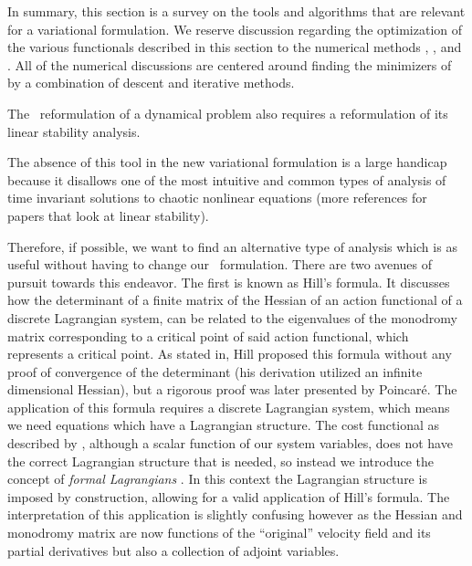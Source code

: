 In summary, this section is a survey on the tools and algorithms that are
relevant for a variational formulation. We reserve discussion regarding
the optimization of the various functionals described in this section to
the numerical methods ,
, and . All of the
numerical discussions are centered around finding the minimizers of
 by a combination of descent and iterative
methods.


The \spt\ reformulation of a dynamical problem also
requires a reformulation of its linear stability
analysis.

The absence of this tool in the new variational formulation is
a large handicap because it disallows one of the most intuitive
and common types of analysis of time invariant solutions to chaotic
nonlinear equations (more references for papers that look at linear stability).

Therefore, if possible, we want to find an alternative type of analysis
which is as useful without having to change our \spt\ formulation.
There are two avenues of pursuit towards this endeavor. The first is
known as Hill's formula. It discusses how the
determinant of a finite matrix of the Hessian of an action functional
of a discrete Lagrangian system, can be related to the eigenvalues
of the monodromy matrix corresponding to a critical point of said action
functional, which represents a critical point. As stated in,
Hill proposed this formula without any proof of convergence of the determinant
(his derivation utilized an infinite dimensional Hessian), but a rigorous
proof was later presented by Poincar\'e. The application of this formula
requires a discrete Lagrangian system, which means we need equations which
have a Lagrangian structure. The cost functional as described by
, although a scalar function of our system
variables, does not have the correct Lagrangian structure that is needed,
so instead we introduce the concept of \textit{formal Lagrangians}
. In this context the Lagrangian
structure is imposed by construction, allowing for a valid application
of Hill's formula. The interpretation of this application is slightly
confusing however as the Hessian and monodromy matrix are now functions
of the ``original'' velocity field and its partial derivatives but also
a collection of adjoint variables.
